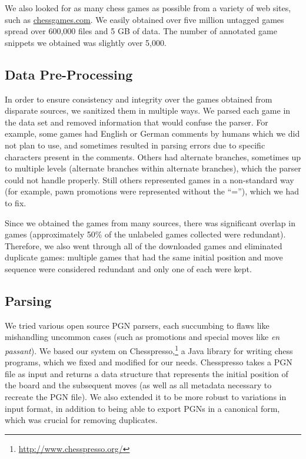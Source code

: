 \documentclass[11pt]{article}
\begin{document}
We also looked for as many chess games as possible from a variety of web 
sites, such as \url{chessgames.com}. We easily obtained over five 
million untagged games spread over 600,000 files and 5 GB of data. The 
number of annotated game snippets we obtained was slightly over 5,000.

\subsection{Data Pre-Processing}	
In order to ensure consistency and integrity over the games obtained 
from disparate sources, we sanitized them in multiple ways. We parsed 
each game in the data set and removed information that would confuse the 
parser. For example, some games had English or German comments by humans 
which we did not plan to use, and sometimes resulted in parsing errors 
due to specific characters present in the comments. Others had alternate 
branches, sometimes up to multiple levels (alternate branches within 
alternate branches), which the parser could not handle properly. Still 
others represented games in a non-standard way (for example, pawn 
promotions were represented without the ``=''), which we had to fix. 

Since we obtained the games from many sources, there was significant 
overlap in games (approximately 50\% of the unlabeled games collected 
were redundant). Therefore, we also went through all of the downloaded 
games and eliminated duplicate games: multiple games that had the same 
initial position and move sequence were considered redundant and only 
one of each were kept.

\subsection{Parsing}
We tried various open source PGN parsers, each succumbing to flaws like 
mishandling uncommon cases (such as  promotions and special moves like 
\emph{en passant}). We based our system on 
Chesspresso,\footnote{\url{http://www.chesspresso.org/}} a Java library 
for writing chess programs, which we fixed and modified for our needs. 
Chesspresso takes a PGN file as input and returns a data structure that 
represents the initial position of the board and the subsequent moves 
(as well as all metadata necessary to recreate the PGN file). We also 
extended it to be more robust to variations in input format, in addition 
to being able to export PGNs in a canonical form, which was crucial for 
removing duplicates.
\end{document}
